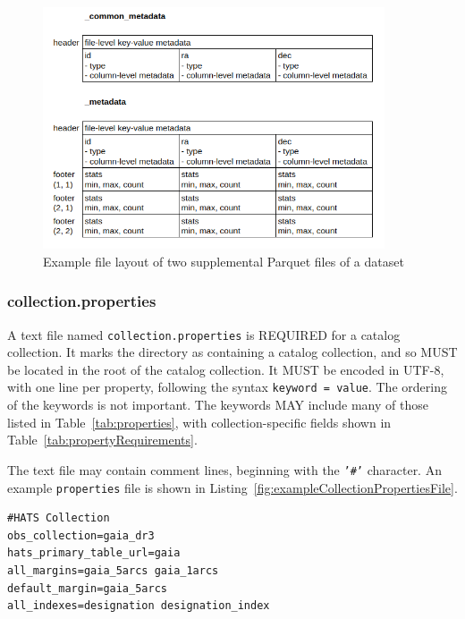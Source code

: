\documentclass[11pt,a4paper]{ivoa}
\begin{document}
\begin{figure}
\centering
\includegraphics[width=0.9\textwidth]{metadata_files.png}
\caption{Example file layout of two supplemental Parquet files of a dataset}
\label{fig:parquetMetadata}
\end{figure}

\subsubsection{collection.properties}\label{sec:collectionProperties}
A text file named \texttt{collection.properties} is REQUIRED for a catalog collection.
It marks the directory as containing a catalog collection, and so MUST be located in the 
root of the catalog collection.
It MUST be encoded in UTF-8, with one line per property, following the syntax \texttt{keyword = value}.
The ordering of the keywords is not important. 
The keywords MAY include many of those listed in Table~\ref{tab:properties}, with collection-specific fields shown in Table~\ref{tab:propertyRequirements}.

The text file may contain comment lines, beginning with the \texttt{'\#'} character.
An example \texttt{properties} file is shown in Listing~\ref{fig:exampleCollectionPropertiesFile}.

\begin{minipage}{\linewidth}
\begin{lstlisting}[caption=Example \texttt{collection.properties} file contents, label=fig:exampleCollectionPropertiesFile]
#HATS Collection
obs_collection=gaia_dr3
hats_primary_table_url=gaia
all_margins=gaia_5arcs gaia_1arcs
default_margin=gaia_5arcs
all_indexes=designation designation_index
\end{lstlisting}
\end{minipage}
\end{document}
